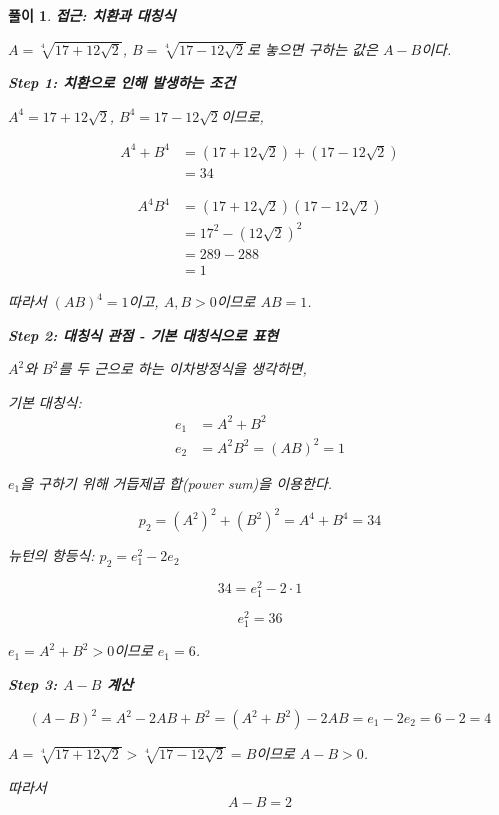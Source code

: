 \documentclass[12pt,a4paper]{article}
\theoremstyle{test_form}
\newtheorem*{solution}{풀이}
\begin{document}
\begin{solution}

\setlength{\parindent}{0pt}

\textbf{접근: 치환과 대칭식}

\(A = \sqrt[4]{17 + 12\sqrt{2}}\), \(B = \sqrt[4]{17 - 12\sqrt{2}}\)로 놓으면 구하는 값은 \(A - B\)이다.


\textbf{Step 1: 치환으로 인해 발생하는 조건}

\(A^4 = 17 + 12\sqrt{2}\), \(B^4 = 17 - 12\sqrt{2}\)이므로,

\[
\begin{aligned}
  A^4 + B^4 &= (17 + 12\sqrt{2}) + (17 - 12\sqrt{2}) \\
  &= 34
\end{aligned}
\]

\[
  \begin{aligned}
  A^4 B^4 &= (17 + 12\sqrt{2})(17 - 12\sqrt{2}) \\
  &= 17^2 - (12\sqrt{2})^2 \\
  &= 289 - 288 \\
  &= 1
  \end{aligned}
\]

따라서 \((AB)^4 = 1\)이고, \(A, B > 0\)이므로 \(\boxed{AB = 1}\).


\textbf{Step 2: 대칭식 관점 - 기본 대칭식으로 표현}

\(A^2\)와 \(B^2\)를 두 근으로 하는 이차방정식을 생각하면,

기본 대칭식:
\[
\begin{aligned}
e_1 &= A^2 + B^2 \\
e_2 &= A^2 B^2 = (AB)^2 = 1
\end{aligned}
\]

\(e_1\)을 구하기 위해 거듭제곱 합(power sum)을 이용한다.

\[
p_2 = (A^2)^2 + (B^2)^2 = A^4 + B^4 = 34
\]

뉴턴의 항등식: \(p_2 = e_1^2 - 2e_2\)

\[
34 = e_1^2 - 2 \cdot 1
\]

\[
e_1^2 = 36
\]

\(e_1 = A^2 + B^2 > 0\)이므로 \(e_1 = 6\).

\vspace{0.3cm}

\textbf{Step 3: \(A - B\) 계산}

\[
(A - B)^2 = A^2 - 2AB + B^2 = (A^2 + B^2) - 2AB = e_1 - 2e_2 = 6 - 2 = 4
\]

\(A = \sqrt[4]{17 + 12\sqrt{2}} > \sqrt[4]{17 - 12\sqrt{2}} = B\)이므로 \(A - B > 0\).

따라서
\[
A - B = 2
\]

\end{solution}
\end{document}
